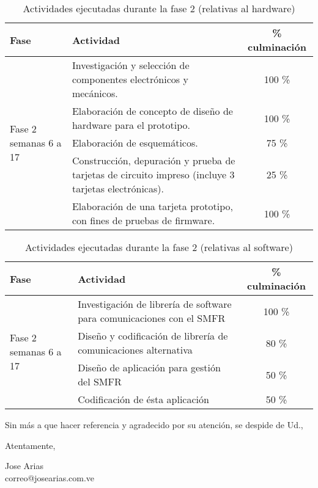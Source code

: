 \documentclass[paper=letter,oneside,fontsize=12pt, parskip=full]{article}
\begin{document}
	\begin{table}[h!]
		\begin{tabularx}{\textwidth}{p{}p{}c}
			\toprule
			{Fase} & 
			{Actividad} & 
			{\% culminación} \\
			\midrule
			\multirow{5}{0.15\textwidth}{Fase 2 \newline \small semanas 6 a 17} &
			Investigación y selección de componentes electrónicos y mecánicos. & 100 \% \\
			& Elaboración de concepto de diseño de hardware para el prototipo. & 100 \% \\
			& Elaboración de esquemáticos. & 75 \% \\
			& Construcción, depuración y prueba  de tarjetas de circuito impreso (incluye 3 tarjetas electrónicas). & 25 \% \\	
			& Elaboración de una tarjeta prototipo, con fines de pruebas de firmware. & 100 \% \\
			\bottomrule			
		\end{tabularx}
		\caption{Actividades ejecutadas durante la fase 2 (relativas al hardware)}
	\end{table}

	\begin{table}[h!]
		\begin{tabularx}{\textwidth}{p{}p{}c}
			\toprule
			{Fase} & 
			{Actividad} & 
			{\% culminación} \\
			\midrule
			\multirow{4}{0.15\textwidth}{Fase 2 \newline \small semanas 6 a 17} &
			Investigación de librería de software para comunicaciones con el SMFR & 100 \% \\
			& Diseño y codificación de librería de comunicaciones alternativa & 80 \% \\
			& Diseño de aplicación para gestión del SMFR & 50 \% \\
			& Codificación de ésta aplicación & 50 \% \\	
			\bottomrule	
		\end{tabularx}
		\caption{Actividades ejecutadas durante la fase 2 (relativas al software)}
	\end{table}	

	\newpage	

	Sin más a que hacer referencia y agradecido por su atención, se despide de Ud.,	
	
	
	\begin{flushright}
		Atentamente, 			
	
		\vspace{1.5cm}
		\begin{singlespace}
			\large
			Jose Arias \\
			{
				\small			
				correo@josearias.com.ve \\			
			}	
		\end{singlespace}
	
	\end{flushright}
\end{document}
